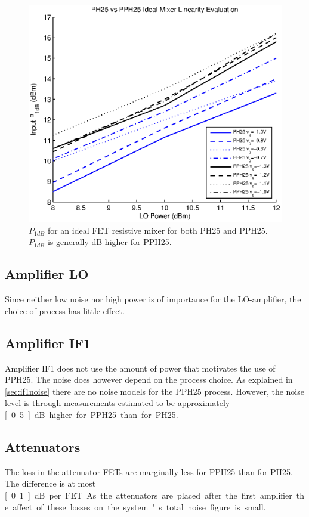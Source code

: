 			\begin{figure}[hbt!]
				\centering
				\includegraphics[width=1.0\textwidth]{fig/process/ph25vspph25}
				\caption[$P_{1dB}$ for an ideal FET resistive mixer for both PH25 and PPH25.]{$P_{1dB}$ for an ideal FET resistive mixer for both PH25 and PPH25. $P_{1dB}$ is generally \unit[1]{dB} higher for PPH25.}\label{fig:ph25vspph25}
			\end{figure}

		\subsection{Amplifier LO}
			Since neither low noise nor high power is of importance for the LO-amplifier, the choice of process has little effect.
			
		\subsection{Amplifier IF1}
			Amplifier IF1 does not use the amount of power that motivates the use of PPH25. The noise does however depend on the process choice. As explained in \autoref{sec:if1noise} there are no noise models for the PPH25 process. However, the noise level is through measurements estimated to be approximately \unit[0.5]{dB} higher for PPH25 than for PH25.
			
		\subsection{Attenuators}
			The loss in the attenuator-FETs are marginally less for PPH25 than for PH25. The difference is at most \unit[0.1]{dB} per FET. As the attenuators are placed after the first amplifier the affect of these losses on the system's total noise figure is small.

